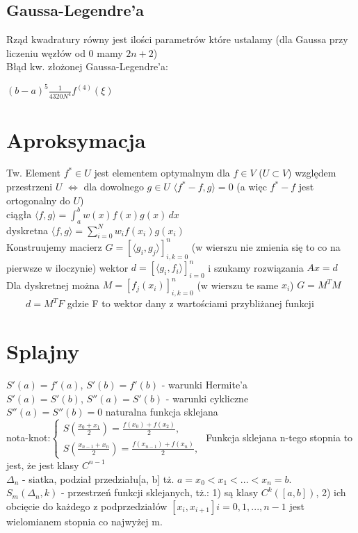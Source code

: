 \documentclass[twocolumn]{article}
\begin{document}
\begin{flushleft}
\subsection{Gaussa-Legendre’a}
Rząd kwadratury równy jest ilości parametrów które ustalamy (dla Gaussa przy liczeniu węzłów od 0 mamy $2n+2$)\\
Błąd kw. złożonej Gaussa-Legendre’a:\\
\begin{center}
$(b-a)^5\frac{1}{4320N^4}f^{(4)}(\xi)$
\end{center}
\section{Aproksymacja}
Tw. Element $f^* \in U$ jest elementem optymalnym dla $f\in V$ ($U \subset V$) względem przestrzeni $U$ $\iff$ dla dowolnego $g \in U$ $\langle f^* -f,g\rangle = 0$ (a więc $f^* -f$ jest ortogonalny do $U$)\\
\vspace{3mm}
ciągła $\langle f,g \rangle = \int_a^b w(x)f(x)g(x) \,dx$\\
dyskretna $\langle f,g \rangle = \sum_{i=0}^Nw_if(x_i)g(x_i)$\\\vspace{3mm}
Konstruujemy macierz $G = \left[\langle g_i,g_j \rangle\right]_{i,k = 0}^n$ (w wierszu nie zmienia się to co na pierwsze w iloczynie) wektor $d = \left[\langle g_i, f_i\rangle \right]_{i = 0}^n$ i szukamy rozwiązania $Ax=d$\\
Dla dyskretnej można $M = \left[f_j(x_i)\right]_{i,k = 0}^n$ (w wierszu te same $x_i$) $G = M^TM$ \ \ \ \  $d = M^TF$ gdzie F to wektor dany z wartościami przybliżanej funkcji
\section{Splajny}
$S'(a)=f'(a)$, $S'(b)=f'(b)$ - warunki Hermite'a\\
$S'(a)=S'(b)$, $S''(a)=S'(b)$ - warunki cykliczne\\
$S''(a)=S''(b)=0$ naturalna funkcja sklejana\\
nota-knot:$
\begin{cases}
    S(\frac{x_0+x_1}{2})=\frac{f(x_0)+f(x_2)}{2}, \\
    S(\frac{x_{n-1}+x_n}{2})=\frac{f(x_{n-1})+f(x_n)}{2},
\end{cases}$
Funkcja sklejana n-tego stopnia to jest, że jest klasy $C^{n-1}$\\
$\Delta_n $ - siatka, podział przedziału[a, b] tż. $a = x_0 < x_1 < ... < x_n = b$.\\
$S_m(\Delta_n, k)$ - przestrzeń funkcji sklejanych, tż.: 1) są klasy $C^k([a, b])$, 2) ich obcięcie do każdego z podprzedziałów $[x_i, x_{i+1}] i = 0, 1, ..., n-1$ jest wielomianem stopnia co najwyżej m.\\

\end{flushleft}
\end{document}
